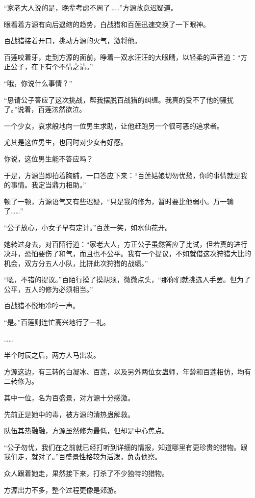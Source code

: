 \begin{this_body}
“家老大人说的是，晚辈考虑不周了……”方源故意迟疑道。

眼看着方源有向后退缩的趋势，白战猎和百莲迅速交换了一下眼神。

百战猎接着开口，挑动方源的火气，激将他。

百莲咬着牙，走到方源的面前，睁着一双水汪汪的大眼睛，以轻柔的声音道：“方正公子，在下有个不情之请。”

“哦，你说什么事情？”

“恳请公子答应了这次挑战，帮我摆脱百战猎的纠缠。我真的受不了他的骚扰了。”说着，百莲泫然欲泣。

一个少女，哀求般地向一位男生求助，让他赶跑另一个很可恶的追求者。

尤其是这位男生，也同时对少女有好感。

你说，这位男生能不答应吗？

于是，方源当即拍着胸脯，一口答应下来：“百莲姑娘切勿忧愁，你的事情就是我的事情。我定当鼎力相助。”

顿了一顿，方源语气又有些迟疑，“只是我的修为，暂时要比他弱小。万一输了……”

“公子放心，小女子早有定计。”百莲一笑，如水仙花开。

她转过身去，对百陌行道：“家老大人，方正公子虽然答应了比试，但若真的进行决斗，恐怕要伤了和气，而且也不公平。我有一个提议，不如就借这次狩猎大比的机会，双方分五人小队，比拼此次狩猎的战绩。”

“嗯，不错的提议。”百陌行摸了摸胡须，微微点头，“那你们就挑选人手罢。但为了公平，五人的修为必须相当。”

百战猎不悦地冷哼一声。

“是。”百莲则连忙高兴地行了一礼。

……

半个时辰之后，两方人马出发。

方源这边，有三转的白凝冰、百莲，以及另外两位女蛊师，年龄和百莲相仿，均有二转修为。

其中一位，名为百盛景，对方源十分感激。

先前正是她中的毒，被方源的清热蛊解救。

队伍其热融融，方源虽然修为最低，但却是中心焦点。

“公子勿忧，我们在之前就已经打听到详细的情报，知道哪里有更珍贵的猎物。跟我们走，就对了。”百盛景性格较为活泼，负责侦察。

众人跟着她走，果然接下来，打杀了不少独特的猎物。

方源出力不多，整个过程更像是郊游。


\end{this_body}
